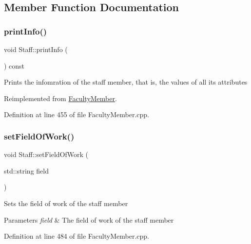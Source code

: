 \subsection{Member Function Documentation}
\mbox{\label{classStaff_a3b9babe4708b787b8aeb4d02be4ba1eb}} 
\subsubsection{\texorpdfstring{print\+Info()}{printInfo()}}
{\footnotesize\ttfamily void Staff\+::print\+Info (\begin{DoxyParamCaption}{ }\end{DoxyParamCaption}) const\hspace{0.3cm}{\ttfamily [virtual]}}

Prints the infomration of the staff member, that is, the values of all its attributes 

Reimplemented from \hyperlink{classFacultyMember_af07c814d58d1a2e309c74a0c57b95fd1}{Faculty\+Member}.



Definition at line 455 of file Faculty\+Member.\+cpp.

\mbox{\label{classStaff_a3522c4036c9fcc08d2cd2ad4032ef507}} 
\subsubsection{\texorpdfstring{set\+Field\+Of\+Work()}{setFieldOfWork()}}
{\footnotesize\ttfamily void Staff\+::set\+Field\+Of\+Work (\begin{DoxyParamCaption}\item[{std\+::string}]{field }\end{DoxyParamCaption})}

Sets the field of work of the staff member 
\begin{DoxyParams}{Parameters}
{\em field} & The field of work of the staff member \\
\hline
\end{DoxyParams}


Definition at line 484 of file Faculty\+Member.\+cpp.

